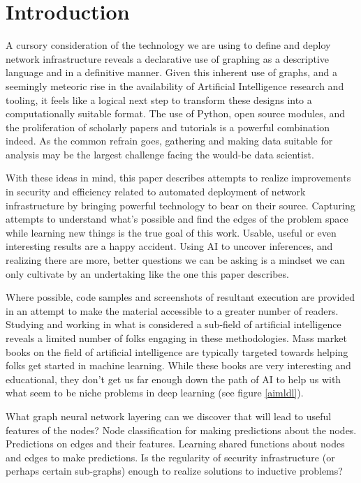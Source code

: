 \section{\label{sec:intro}Introduction}

\justifying
A cursory consideration of the technology we are using to define and deploy network infrastructure
reveals a declarative use of graphing as a descriptive language and in a definitive manner. Given this inherent
use of graphs, and a seemingly meteoric rise in the availability of Artificial Intelligence research and tooling, it feels
like a logical next step to transform these designs into a computationally suitable format. The use of Python, open
source modules, and the proliferation of scholarly papers and tutorials is a powerful combination indeed. As the common
refrain goes, gathering and making data suitable for analysis may be the largest challenge facing the would-be data
scientist.
\vspace{2mm}

\justifying
With these ideas in mind, this paper describes attempts to realize improvements in security and efficiency related to
automated deployment of network infrastructure by bringing powerful technology to bear on their source. Capturing attempts
to understand what's possible and find the edges of the problem space while learning new things is the true goal of this
work. Usable, useful or even interesting results are a happy accident. Using AI to uncover inferences, and realizing there are more,
better questions we can be asking is a mindset we can only cultivate by an undertaking like the one this paper describes.
\vspace{2mm}

\justifying
Where possible, code samples and screenshots of resultant execution are provided in an attempt to make the material
accessible to a greater number of readers. Studying and working in what is considered a sub-field of artificial
intelligence reveals a limited number of folks engaging in these methodologies. Mass market books on the field of
artificial intelligence are typically targeted towards helping folks get started in machine learning. While these books
are very interesting and educational, they don't get us far enough down the path of AI to help us with what seem to be
niche problems in deep learning (see figure \ref{aimldl}).
\vspace{2mm}

What graph neural network layering can we discover that will lead to useful features of the nodes?
Node classification for making predictions about the nodes.
Predictions on edges and their features.
Learning shared functions about nodes and edges to make predictions.
Is the regularity of security infrastructure (or perhaps certain sub-graphs) enough to realize solutions to inductive problems?

